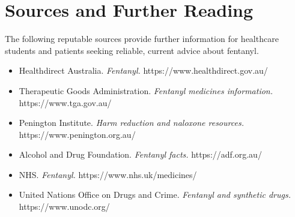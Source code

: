 \section*{Sources and Further Reading}
The following reputable sources provide further information for healthcare students and patients seeking reliable, current advice about fentanyl.
\begin{itemize}
    \item Healthdirect Australia. \textit{Fentanyl.} https://www.healthdirect.gov.au/
    \item Therapeutic Goods Administration. \textit{Fentanyl medicines information.} https://www.tga.gov.au/
    \item Penington Institute. \textit{Harm reduction and naloxone resources.} https://www.penington.org.au/
    \item Alcohol and Drug Foundation. \textit{Fentanyl facts.} https://adf.org.au/
    \item NHS. \textit{Fentanyl.} https://www.nhs.uk/medicines/
    \item United Nations Office on Drugs and Crime. \textit{Fentanyl and synthetic drugs.} https://www.unodc.org/
\end{itemize}
